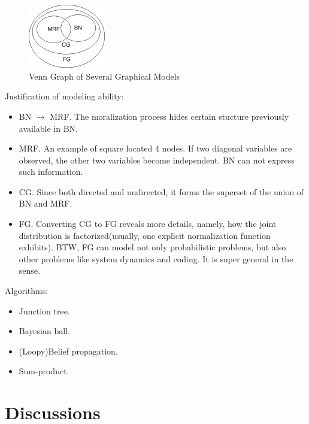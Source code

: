 \documentclass[11pt,a4paper]{article}
\begin{document}
\begin{figure}[htb]
\centering
	\includegraphics[width=0.3\textwidth]{illustration/graphical-venn.png}
	\caption{Venn Graph of Several Graphical Models}
\end{figure}

Justification of modeling ability:
\begin{itemize}
	\item BN $\rightarrow$ MRF. The moralization process hides certain stucture 
	previously available in BN. 
	\item MRF. An example of square located 4 nodes. If two diagonal variables 
	are observed, the other two variables become independent. BN can not express 
	such information. 
	\item CG. Since both directed and undirected, it forms the superset of 
	the union of BN and	MRF.
	\item FG. Converting CG to FG reveals more details, namely, how the joint 
	distribution is factorized(usually, one explicit normalization function 
	exhibits). BTW, FG can model not only probabilistic problems, but also 
	other problems like system dynamics and coding. It is super general in the
	sense.
\end{itemize}


Algorithms:
\begin{itemize}
	\item Junction tree. 
	\item Bayesian ball. 
	\item (Loopy)Belief propagation. 
	\item Sum-product. 
\end{itemize}

\section{Discussions}
\end{document}
